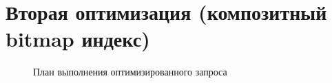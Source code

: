 

\section{Вторая оптимизация (композитный bitmap индекс)}


\begin{figure}[H]%
  \caption{План выполнения оптимизированного запроса}
  \label{fig-task-5-bitmap-composite-plan}
\end{figure}
